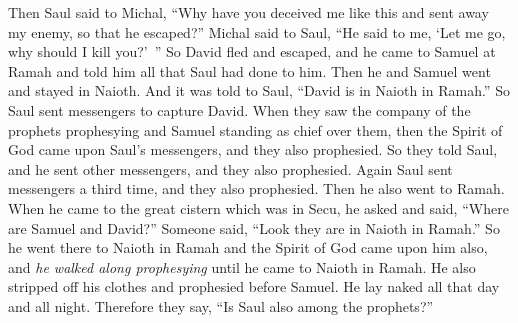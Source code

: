\begin{biblechapter}
\verse Then Saul said to Michal, “Why have you deceived me like this and sent away my enemy, so that he escaped?” Michal said to Saul, “He said to me, ‘Let me go, why should I kill you?’ ”
\verse So David fled and escaped, and he came to Samuel at Ramah and told him all that Saul had done to him. Then he and Samuel went and stayed in Naioth.
\verse And it was told to Saul, “David is in Naioth in Ramah.”
\verse So Saul sent messengers to capture David. When they saw the company of the prophets prophesying and Samuel standing as chief over them, then the Spirit of God came upon Saul’s messengers, and they also prophesied.
\verse So they told Saul, and he sent other messengers, and they also prophesied. Again Saul sent messengers a third time, and they also prophesied.
\verse Then he also went to Ramah. When he came to the great cistern which was in Secu, he asked and said, “Where are Samuel and David?” Someone said, “Look they are in Naioth in Ramah.”
\verse So he went there to Naioth in Ramah and the Spirit of God came upon him also, and \textit{he walked along prophesying} until he came to Naioth in Ramah.
\verse He also stripped off his clothes and prophesied before Samuel. He lay naked all that day and all night. Therefore they say, “Is Saul also among the prophets?”
\end{biblechapter}

